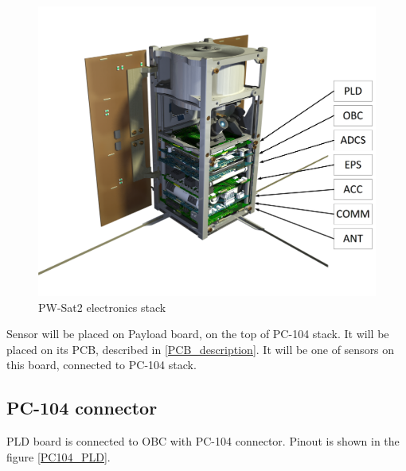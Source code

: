         \begin{figure}[H]
            \centering
            \includegraphics[width=0.7\paperwidth]{img/PW-Sat2-stack.png}
            \caption{PW-Sat2 electronics stack}
            \label{PW-Sat2_stack}
        \end{figure}


        Sensor will be placed on Payload board, on the top of PC-104 stack. It will be placed on its PCB, described in \ref{PCB_description}. It will be one of sensors on this board, connected to PC-104 stack.


    \subsection{PC-104 connector}
        PLD board is connected to OBC with PC-104 connector. Pinout is shown in the figure \ref{PC104_PLD}.


